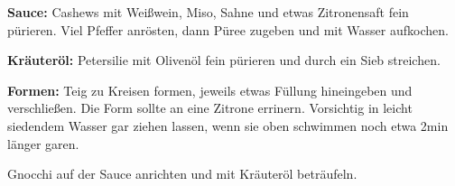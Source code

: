 \begin{recipe}
{        
    \step%
    \textbf{Sauce:} Cashews mit Weißwein, Miso, Sahne und etwas Zitronensaft fein pürieren.
        Viel Pfeffer anrösten, dann Püree zugeben und mit Wasser aufkochen.
        
        
    \step%
    \textbf{Kräuteröl:} Petersilie mit Olivenöl fein pürieren und durch ein Sieb streichen.
        
        
    \step%
    \textbf{Formen:} Teig zu Kreisen formen, jeweils etwas Füllung hineingeben und verschließen. Die Form sollte an eine Zitrone errinern. Vorsichtig in leicht siedendem Wasser gar ziehen lassen, wenn sie oben schwimmen noch etwa 2min länger garen.
        
        
    \step%
    Gnocchi auf der Sauce anrichten und mit Kräuteröl beträufeln.
}
    
\end{recipe}